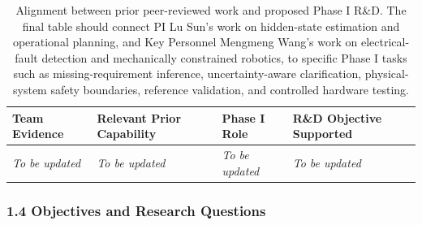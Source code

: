 \begin{table}[H]
\centering
\caption{Alignment between prior peer-reviewed work and proposed Phase I R\&D. The final table should connect PI Lu Sun's work on hidden-state estimation and operational planning, and Key Personnel Mengmeng Wang's work on electrical-fault detection and mechanically constrained robotics, to specific Phase I tasks such as missing-requirement inference, uncertainty-aware clarification, physical-system safety boundaries, reference validation, and controlled hardware testing.}
\label{tab:team_prior_work_alignment}
\renewcommand{\arraystretch}{1.12}
\small
\begin{tabular}{p{} p{} p{} p{}}
\hline
\textbf{Team Evidence} & \textbf{Relevant Prior Capability} & \textbf{Phase I Role} & \textbf{R\&D Objective Supported} \\
\hline
\textit{To be updated} & \textit{To be updated} & \textit{To be updated} & \textit{To be updated} \\
\hline
\end{tabular}
\end{table}


\subsubsection*{1.4 Objectives and Research Questions}

